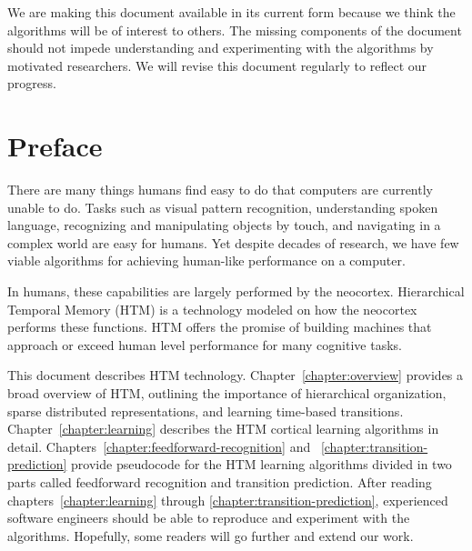 \documentclass{report}
\begin{document}
We are making this document available in its current form because we
think the algorithms will be of interest to others. The missing
components of the document should not impede understanding and
experimenting with the algorithms by motivated researchers. We will
revise this document regularly to reflect our progress.

\tableofcontents


\chapter*{Preface}

There are many things humans find easy to do that computers are
currently unable to do. Tasks such as visual pattern recognition,
understanding spoken language, recognizing and manipulating objects by
touch, and navigating in a complex world are easy for humans. Yet
despite decades of research, we have few viable algorithms for
achieving human-like performance on a computer.

In humans, these capabilities are largely performed by the
neocortex. Hierarchical Temporal Memory (HTM) is a technology modeled
on how the neocortex performs these functions. HTM offers the promise
of building machines that approach or exceed human level performance
for many cognitive tasks.

This document describes HTM technology. Chapter~\ref{chapter:overview}
provides a broad overview of HTM, outlining the importance of
hierarchical organization, sparse distributed representations, and
learning time-based transitions. Chapter~\ref{chapter:learning}
describes the HTM cortical learning algorithms in
detail. Chapters~\ref{chapter:feedforward-recognition} and ~\ref{chapter:transition-prediction}
provide pseudocode for the HTM learning
algorithms divided in two parts called feedforward recognition and transition
prediction. After reading chapters~\ref{chapter:learning} through
\ref{chapter:transition-prediction}, experienced software engineers should
be able to reproduce and experiment with the algorithms. Hopefully,
some readers will go further and extend our work.
\end{document}
